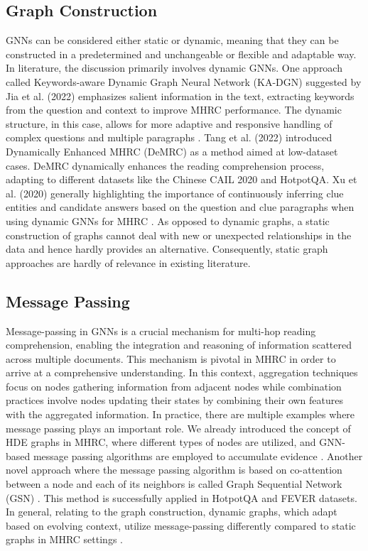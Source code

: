 \documentclass[sigplan,screen,nonacm]{acmart}
\begin{document}
\subsection{Graph Construction}
GNNs can be considered either static or dynamic, meaning that they can be constructed in a predetermined and unchangeable or flexible 
and adaptable way. In literature, the discussion primarily involves dynamic GNNs. One approach called Keywords-aware Dynamic Graph Neural Network (KA-DGN)
suggested by Jia et al. (2022) \cite{RN171b} emphasizes salient information in the text, extracting keywords from the question and context to improve MHRC performance.
The dynamic structure, in this case, allows for more adaptive and responsive handling of complex questions and multiple paragraphs \cite{RN171b}. Tang et al. (2022) \cite{RN172} introduced Dynamically Enhanced MHRC (DeMRC) as a method aimed at low-dataset cases. DeMRC dynamically enhances the reading comprehension process,
adapting to different datasets like the Chinese CAIL 2020 and HotpotQA. Xu et al. (2020) generally highlighting the importance of continuously inferring
clue entities and candidate answers based on the question and clue paragraphs when using dynamic GNNs for MHRC \cite{RN173}. 
As opposed to dynamic graphs, a static construction of graphs cannot deal with new or unexpected relationships in the data and hence hardly
provides an alternative. Consequently, static graph approaches are hardly of relevance in existing literature. 

\subsection{Message Passing}
Message-passing in GNNs is a crucial mechanism for multi-hop reading comprehension, enabling the integration and reasoning of information scattered across multiple documents. 
This mechanism is pivotal in MHRC in order to arrive at a comprehensive understanding. In this context, aggregation techniques focus on nodes gathering information
from adjacent nodes while combination practices involve nodes updating their states by combining their own features with the aggregated information. In practice,
there are multiple examples where message passing plays an important role. We already introduced the concept of HDE graphs in MHRC, where different types of 
nodes are utilized, and GNN-based message passing algorithms are employed to accumulate evidence \cite{RN124}. Another novel approach where the message
passing algorithm is based on co-attention between a node and each of its neighbors is called Graph Sequential Network (GSN) \cite{RN210}. This method is 
successfully applied in HotpotQA and FEVER datasets. In general, relating to the graph construction, dynamic graphs, which adapt based on evolving context, 
utilize message-passing differently compared to static graphs in MHRC settings \cite{RN171b}. 
\end{document}
